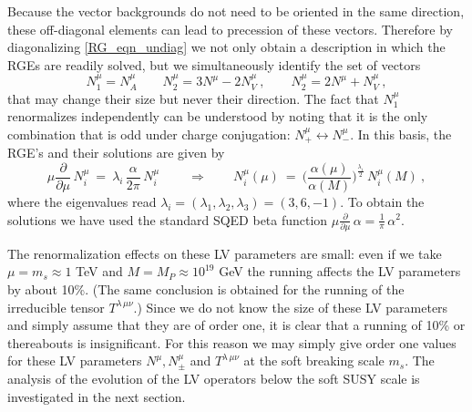\documentclass[12pt]{revtex4}
\begin{document}
Because the vector backgrounds do not need to be oriented in the
same direction, these off-diagonal elements can lead to precession of
these vectors. Therefore by diagonalizing \eqref{RG_eqn_undiag} 
we not only obtain a description in which the RGEs are readily solved,
but we simultaneously identify the set of vectors 
\begin{equation*}
N_1^\mu = N^\mu_A
\qquad 
N_2^\mu = 3 N^\mu - 2 N^\mu_V~,
\qquad 
N_2^\mu = 2 N^\mu + N^\mu_V~,
\end{equation*} 
that may change their size but never their direction. The fact that
$N_1^\mu$ renormalizes independently can be understood by noting 
that it is the only combination that is odd under charge conjugation:
 $N_+^\mu \leftrightarrow N_-^\mu$. 
In this basis, the RGE's and their solutions are given by 
\begin{equation} 
\mu \frac{\partial}{\partial\mu} \, N_i^\mu 
~=~ \lambda_i\, \frac { \alpha}{2 \pi} \, N_i^\mu~ 
\qquad \Rightarrow \qquad 
N_i^\mu(\mu) ~=~ 
\Big(  \frac {\alpha(\mu)}{\alpha(M)} \Big)^{\frac {\lambda_i}2} \, 
N_i^\mu(M)~, 
\label{LV_at_soft_scale}
\end{equation} 
where the eigenvalues read 
$\lambda_i = (\lambda_1, \lambda_2, \lambda_3) = (3, 6, -1)$. 
To obtain the solutions we have used the standard SQED beta function  
\( 
\mu \frac{\partial}{\partial\mu} \, \alpha = \frac 1{\pi} \,
\alpha^2.  
\) 


The renormalization effects on these LV parameters are small: 
even if we take $\mu = m_{s} \approx 1$ TeV and 
$M = M_P \approx 10^{19}$ GeV the running affects the LV parameters by
about 10\%. (The same conclusion is obtained for the running of the
irreducible tensor $T^{\lambda\, \mu\nu}$.) Since we do not know the
size of these LV parameters and simply assume that they are of order
one, it is clear that a running of 10\% or thereabouts is
insignificant. For this reason we may simply give order one values for
these LV parameters $N^\mu, N_\pm^\mu$ and $T^{\lambda\, \mu\nu}$ at
the soft breaking scale $m_{s}$. The analysis of the evolution of
the LV operators below the soft SUSY scale is investigated in the next
section. 



\end{document}
